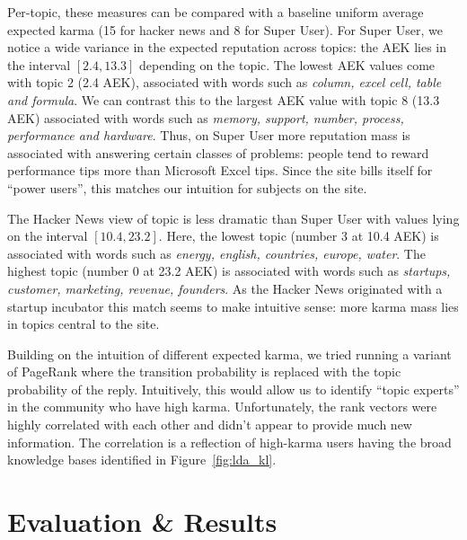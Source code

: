 \documentclass[11pt]{article}
\begin{document}
Per-topic, these measures can be compared with a baseline uniform average
expected karma (15 for hacker news and 8 for Super User). For Super User, we
notice a wide variance in the expected reputation across topics: the AEK lies in
the interval $[2.4, 13.3]$ depending on the topic. The lowest AEK values come
with topic 2 (2.4 AEK), associated with words such as \textit{column, excel
cell, table and formula}. We can contrast this to the
largest AEK value with topic 8 (13.3 AEK) associated with words such as
\textit{memory, support, number, process, performance and hardware}. Thus, on
Super User more reputation mass is associated with answering certain classes of
problems: people tend to reward performance tips more than Microsoft Excel tips.
Since the site bills itself for ``power users'', this matches our intuition for
subjects on the site.

The Hacker News view of topic is less dramatic than Super User with values lying
on the interval $[10.4, 23.2]$. Here, the lowest topic (number 3 at 10.4 AEK) is
associated with words such as \textit{energy, english, countries, europe,
water}. The highest topic (number 0 at 23.2 AEK) is associated with words such
as \textit{startups, customer, marketing, revenue, founders}. As the Hacker News
originated with a startup incubator this match seems to make intuitive sense:
more karma mass lies in topics central to the site.

Building on the intuition of different expected karma, we tried running a variant of 
PageRank where the transition probability is replaced with the topic probability of 
the reply. Intuitively, this would allow us to identify ``topic experts'' in the 
community who have high karma. Unfortunately, the rank vectors were highly correlated
with each other and didn't appear to provide much new information. The correlation is 
a reflection of high-karma users having the broad knowledge bases identified in 
Figure~\ref{fig:lda_kl}.


\section{Evaluation \& Results}
\label{sec:eval}
\end{document}
